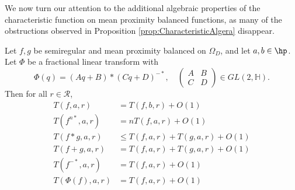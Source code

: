 \documentclass{amsart}
\begin{document}
We now turn our attention to the additional algebraic properties of the characteristic function on mean proximity balanced functions, as many of the obstructions observed in Proposition \ref{prop:CharacteristicAlgera} disappear. 

\begin{prop}\label{prop:CharacteristicAlgebraMPB}
     Let $f,g$ be semiregular and mean proximity balanced on $\Omega_D$, and let $a,b\in\hp$. Let $\Phi$ be a fractional linear transform with 
\[
\Phi(q) = (Aq + B)*(Cq + D)^{-*},
\quad
\begin{pmatrix}
A & B\\
C & D
\end{pmatrix}
\in GL(2,\mathbb H).
\]
Then for all $r\in\mathcal R$, 
  \begin{align}
    T(f,a,r)&=T(f,b,r)+O(1)  \label{eq:1CharactersticAlgebraMPB}\\
    T(f^{n*},a,r)&=nT(f,a,r)+O(1) \label{eq:2CharactersticAlgebraMPB}\\
    T(f*g,a,r)&\leq T(f,a,r)+T(g,a,r)+O(1) \label{eq:3CharactersticAlgebraMPB}\\
    T(f+g,a,r)&=T(f,a,r)+T(g,a,r)+O(1) \label{eq:4CharactersticAlgebraMPB}\\
    T(f^{-*},a,r)&=T(f,a,r)+O(1)  \label{eq:5CharactersticAlgebraMPB}\\
    T(\Phi(f),a,r) &= T(f,a,r)+O(1)  \label{eq:6CharactersticAlgebraMPB}
\end{align}
\end{prop}
\end{document}
